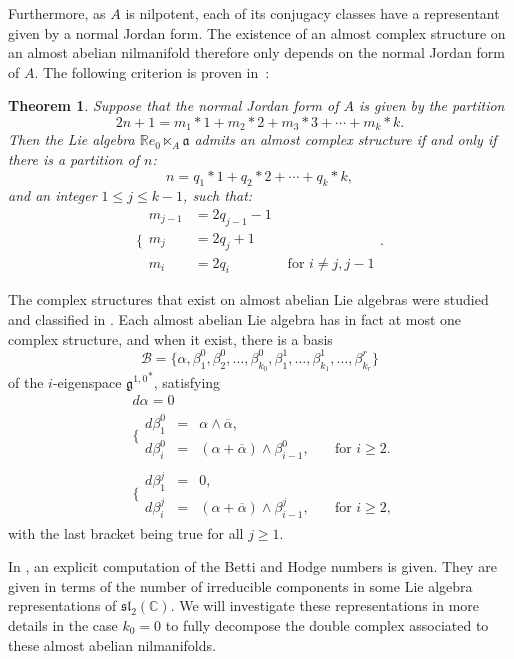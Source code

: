 \documentclass[leqno]{article}
\newtheorem{Theorem}[equation]{Theorem}
\theoremstyle{definition}
\numberwithin{equation}{section}
\begin{document}
Furthermore, as $A$ is nilpotent, each of its conjugacy classes have a representant given by a normal Jordan form. The existence of an almost complex structure on an almost abelian nilmanifold therefore only depends on the normal Jordan form of $A$. The following criterion is proven in~\cite{ABDGH}:
\begin{Theorem}
Suppose that the normal Jordan form of $A$ is given by the partition
\[
2n+1
=
m_1 * 1 + m_2 * 2 + m_3 * 3 + \cdots + m_k*k.
\]
Then the Lie algebra $\mathbb{R}e_0 \ltimes_A \mathfrak{a}$ admits an almost complex structure if and only if there is a partition of $n$:
\[
n = q_1 * 1 + q_2 * 2 + \cdots + q_k*k,
\]
and an integer $1 \leqslant j \leqslant k-1$, such that:
\[
\Bigg\{
\begin{array}{ccc}
m_{j-1} &= 2q_{j-1}-1 &\\
m_j &= 2q_j + 1 &\\
m_i &= 2q_i &\text{ for } i \neq j, j-1
\end{array}.
\]
\end{Theorem} 
The complex structures that exist on almost abelian Lie algebras were studied and classified in \cite{AABRW}.
Each almost abelian Lie algebra has in fact at most one complex structure, and when it exist, there is a basis 
\[
\mathcal{B}
=
\{
\alpha, \beta_1^0, \beta_2^0, \dots, \beta_{k_0}^0, \beta_1^1, \dots, \beta_{k_1}^1, \dots, \beta_{k_r}^r
\}
\]
of the $i$-eigenspace ${\mathfrak{g}^{1, 0}}^*$, satisfying
\begin{align}
\label{str_eq_ab}
& d\alpha = 0 \nonumber \\
&\Big\{
\begin{array}{cccc}
d\beta_1^0 &= &\alpha \wedge \overline{\alpha}, & \\
d\beta_i^0 &= &(\alpha + \overline{\alpha}) \wedge \beta_{i-1}^0, & \quad \text{for } i\geqslant 2.
\end{array} \\
&\Big\{
\begin{array}{cccc}
d\beta_1^j &= &0, & \\
d\beta_i^j &= &(\alpha + \overline{\alpha}) \wedge \beta_{i-1}^j, & \quad \text{for } i\geqslant 2,
\end{array}
\nonumber
\end{align}
with the last bracket being true for all $j \geqslant 1$. 

In \cite{AABRW}, an explicit computation of the Betti and Hodge numbers is given. They are given in terms of the number of irreducible components in some Lie algebra representations of $\mathfrak{sl}_2(\mathbb{C})$. We will investigate these representations in more details in the case $k_0=0$ to fully decompose the double complex associated to these almost abelian nilmanifolds.
\end{document}
